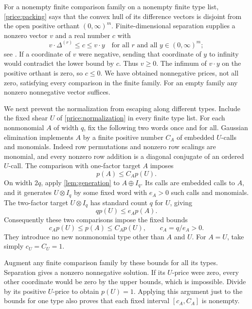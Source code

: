 For a nonempty finite comparison family on a nonempty finite type list,
\cref{price:packing} says that the convex hull of its difference vectors
is disjoint from the open positive orthant \((0,\infty)^m\).
Finite-dimensional separation supplies a nonzero vector \(v\) and a
real number \(c\) with
\[
 v\cdot\Delta^{(r)}\leq c\leq v\cdot y
 \quad\text{for all $r$ and all }y\in(0,\infty)^m;
\]
see \citet[Section~2.5.1, p.~46]{boydVandenberghe2004}.
If a coordinate of \(v\) were negative, sending that coordinate of
\(y\) to infinity would contradict the lower bound by \(c\).
Thus \(v\geq0\).  The infimum of \(v\cdot y\) on the positive
orthant is zero, so \(c\leq0\).  We have obtained nonnegative prices,
not all zero, satisfying every comparison in the finite family.
For an empty family any nonzero nonnegative vector suffices.

We next prevent the normalization from escaping along different types.
Include the fixed shear \(U\) of \cref{price:normalization} in every
finite type list.  For each nonmonomial \(A\) of width \(q\), fix the
following two words once and for all.  Gaussian elimination implements
\(A\) by a finite positive number \(C_A\) of embedded \(U\)-calls
and monomials.  Indeed row permutations and nonzero row scalings are
monomial, and every nonzero row addition is a diagonal conjugate of an
ordered \(U\)-call.  The comparison with one-factor target \(A\)
imposes
\[
 p(A)\leq C_Ap(U).
\]
On width \(2q\), apply \cref{lem:generation} to
\(A\oplus I_q\).  Its calls are embedded calls to \(A\), and it
generates \(U\otimes I_q\) by some fixed word with \(e_A>0\)
such calls and monomials.  The two-factor target \(U\otimes I_q\)
has standard count \(q\) for \(U\), giving
\[
 q p(U)\leq e_Ap(A).
\]
Consequently these two comparisons impose the fixed bounds
\begin{equation}
 c_Ap(U)\leq p(A)\leq C_Ap(U),\qquad c_A=q/e_A>0.
 \label{price:fixed-bounds}
\end{equation}
They introduce no new nonmonomial type other than \(A\) and \(U\).
For \(A=U\), take simply \(c_U=C_U=1\).

Augment any finite comparison family by these bounds for all its types.
Separation gives a nonzero nonnegative solution.  If its \(U\)-price
were zero, every other coordinate would be zero by the upper bounds,
which is impossible.  Divide by its positive \(U\)-price to obtain
\(p(U)=1\).  Applying this argument just to the bounds for one type
also proves that each fixed interval \([c_A,C_A]\) is nonempty.

